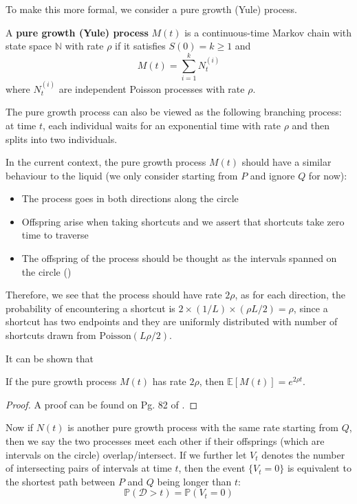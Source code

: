 \documentclass{article}
\begin{document}
To make this more formal, we consider a pure growth (Yule) process.

\begin{definition}
    A \textbf{pure growth (Yule) process} $M(t)$ is a continuous-time Markov chain with state space $\mathbb{N}$ with rate $\rho$ if it satisfies $S(0) = k \geq 1$ and
    \begin{equation*}        
        M(t) = \sum_{i=1}^k N_t^{(i)}
    \end{equation*}
    where $N_t^{(i)}$ are independent Poisson processes with rate $\rho$.
\end{definition}

\begin{remark}
    The pure growth process can also be viewed as the following branching process: at time $t$, each individual waits for an exponential time with rate $\rho$ and then splits into two individuals.
\end{remark}

In the current context, the pure growth process $M(t)$ should have a similar behaviour to the liquid (we only consider starting from $P$ and ignore $Q$ for now):

\begin{itemize}
    \item The process goes in both directions along the circle
    \item Offspring arise when taking shortcuts and we assert that shortcuts take zero time to traverse
    \item The offspring of the process should be thought as the intervals spanned on the circle ()
\end{itemize}

Therefore, we see that the process should have rate $2\rho$, as for each direction, the probability of encountering a shortcut is $2 \times (1/L) \times (\rho L/2) = \rho$, since a shortcut has two endpoints and they are uniformly distributed with number of shortcuts drawn from $\mathrm{Poisson}(L\rho/2)$.  

It can be shown that 
\begin{proposition}
    If the pure growth process $M(t)$ has rate $2\rho$, then $\mathbb{E}[M(t)] = e^{2\rho t}$.
\end{proposition}  
\begin{proof}
    A proof can be found on Pg. 82 of \citep{Norris_1997}.
\end{proof}

Now if $N(t)$ is another pure growth process with the same rate starting from $Q$, then we say the two processes meet each other if their offsprings (which are intervals on the circle) overlap/intersect. If we further let $V_t$ denotes the number of intersecting pairs of intervals at time $t$, then the event $\{V_t=0\}$ is equivalent to the shortest path between $P$ and $Q$ being longer than $t$:
\begin{equation}
    \mathbb{P}(\mathcal{D}>t) = \mathbb{P}(V_t=0)
\end{equation} 
\end{document}
